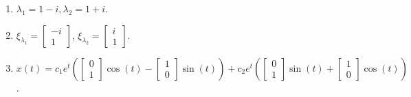 \documentclass{article}
\begin{document}
\begin{enumerate}
\begin{enumerate}
	\item $\lambda_1=1-i,\lambda_2=1+i$.
	\item $\xi_{\lambda_1}=\begin{bmatrix}-i\\1\end{bmatrix}$, $\xi_{\lambda_2}=\begin{bmatrix}i\\1\end{bmatrix}$.
	\item $x(t)=c_1e^t\left(\begin{bmatrix}0\\1\end{bmatrix}\cos(t)-\begin{bmatrix}1\\0\end{bmatrix}\sin(t)\right)+c_2e^t\left(\begin{bmatrix}0\\1\end{bmatrix}\sin(t)+\begin{bmatrix}1\\0\end{bmatrix}\cos(t)\right)$.
\end{enumerate}

\end{enumerate}
\end{document}
